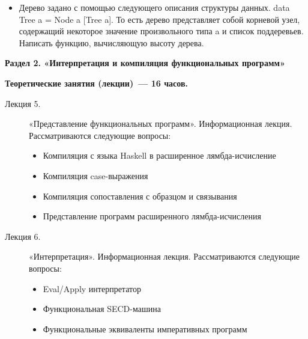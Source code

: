 {\begin{description}
\begin{itemize}
\item Дерево задано с помощью следующего описания структуры данных. data Tree a = Node a [Tree a]. То есть дерево представляет собой корневой узел, содержащий некоторое значение произвольного типа a и список поддеревьев. Написать функцию, вычисляющую высоту дерева.
\end{itemize}
\end{description}


\textbf{Раздел 2. «Интерпретация и компиляция функциональных программ»}

{\parindent0pt

\textbf{Теоретические занятия (лекции)~— 16 часов.}
\begin{description}
\item[Лекция 5.] «Представление функциональных программ». Информационная лекция. Рассматриваются следующие вопросы: \begin{itemize}
\item Компиляция с языка Haskell в расширенное лямбда-исчисление\item Компиляция case-выражения\item Компиляция сопоставления с образцом и связывания\item Представление программ расширенного лямбда-исчисления
\end{itemize}\item[Лекция 6.] «Интерпретация». Информационная лекция. Рассматриваются следующие вопросы: \begin{itemize}
\item Eval/Apply интерпретатор\item Функциональная SECD-машина\item Функциональные эквиваленты императивных программ
\end{itemize}
\end{description}




}}
